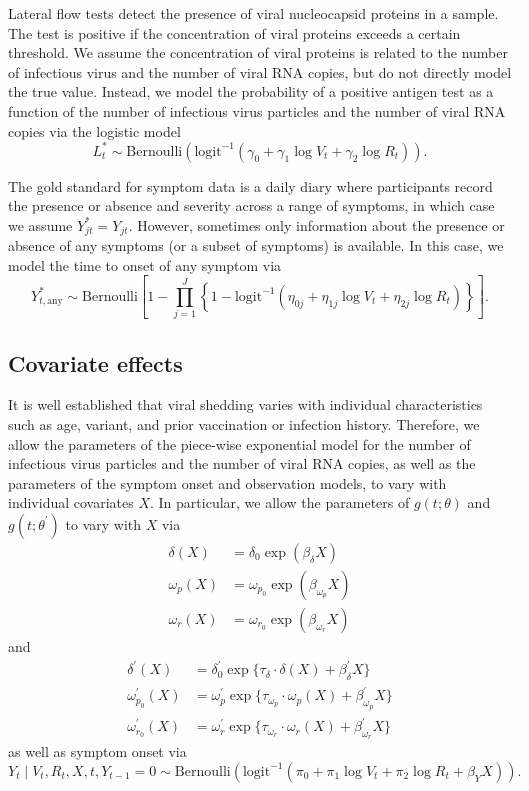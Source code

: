 \documentclass[11pt]{article}
\begin{document}
Lateral flow tests detect the presence of viral nucleocapsid proteins in a sample. The test is positive if the concentration of viral proteins exceeds a certain threshold. We assume the concentration of viral proteins is related to the number of infectious virus and the number of viral RNA copies, but do not directly model the true value. Instead, we model the probability of a positive antigen test as a function of the number of infectious virus particles and the number of viral RNA copies via the logistic model
\begin{equation*}
    L_t^* \sim \text{Bernoulli}(\text{logit}^{-1}(\gamma_0 + \gamma_1 \log V_t + \gamma_2 \log R_t)).
\end{equation*}

The gold standard for symptom data is a daily diary where participants record the presence or absence and severity across a range of symptoms, in which case we assume $Y^*_{jt} = Y_{jt}$. However, sometimes only information about the presence or absence of any symptoms (or a subset of symptoms) is available. In this case, we model the time to onset of any symptom via
\begin{equation*}
    Y^*_{t,\text{any}} \sim \text{Bernoulli}\left[1 - \prod_{j=1}^J \left\{1 - \text{logit}^{-1}(\eta_{0j} + \eta_{1j} \log V_t + \eta_{2j} \log R_t)\right\}\right].
\end{equation*}


\subsection{Covariate effects} 
It is well established that viral shedding varies with individual characteristics such as age, variant, and prior vaccination or infection history. Therefore, we allow the parameters of the piece-wise exponential model for the number of infectious virus particles and the number of viral RNA copies, as well as the parameters of the symptom onset and observation models, to vary with individual covariates $X$. In particular, we allow the parameters of $g(t; \theta)$ and $g(t; \theta^\prime)$ to vary with $X$ via
\begin{align*}
    \delta(X) &= \delta_0 \exp(\beta_\delta X) \\
    \omega_{p}(X) &= \omega_{p_0} \exp(\beta_{\omega_p} X) \\
    \omega_{r}(X) &= \omega_{r_0} \exp(\beta_{\omega_r} X)
\end{align*}
and 
\begin{align*}
    \delta^\prime(X) &= \delta^\prime_0 \exp\{\tau_{\delta} \cdot \delta(X) + \beta^\prime_\delta X\} \\
    \omega^\prime_{p_0}(X) &= \omega^\prime_{p} \exp\{\tau_{\omega_{p}} \cdot \omega_{p}(X) + \beta^\prime_{\omega_p} X\} \\
    \omega^\prime_{r_0}(X) &= \omega^\prime_{r} \exp\{\tau_{\omega_{r}} \cdot \omega_{r}(X) + \beta^\prime_{\omega_r} X\}
\end{align*}
as well as symptom onset via
\begin{equation*}
    Y_t \mid V_t, R_t, X, t, Y_{t-1} = 0 \sim \text{Bernoulli}(\text{logit}^{-1}(\pi_0 + \pi_1 \log V_t + \pi_2 \log R_t + \beta_{Y} X)).
\end{equation*}
\end{document}
